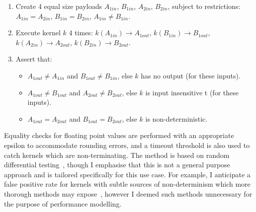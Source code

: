 \begin{enumerate}
\item Create 4 equal size payloads $A_{1in}$, $B_{1in}$, $A_{2in}$,
  $B_{2in}$, subject to restrictions: $A_{1in}=A_{2in}$,
  $B_{1in}=B_{2in}$, $A_{1in} \ne B_{1in}$.
\item Execute kernel $k$ 4 times: $k(A_{1in}) \rightarrow A_{1out}$,
  $k(B_{1in}) \rightarrow B_{1out}$,
  $k(A_{2in}) \rightarrow A_{2out}$,
  $k(B_{2in}) \rightarrow B_{2out}$.
\item Assert that:
  \begin{itemize}
  \item $A_{1out} \ne A_{1in}$ and $B_{1out} \ne B_{1in}$, else $k$ has no
  output (for these inputs).%
  \item $A_{1out} \ne B_{1out}$ and $A_{2out} \ne B_{2out}$, else $k$ is input insensitive t (for these inputs).%
  \item $A_{1out}=A_{2out}$ and $B_{1out}=B_{2out}$, else $k$ is
  non-deterministic.
  \end{itemize}
\end{enumerate}

Equality checks for floating point values are performed with an appropriate epsilon to accommodate rounding errors, and a timeout threshold is also used to catch kernels which are non-terminating. The method is based on random differential testing~\cite{McKeeman1998}, though I emphasise that this is not a general purpose approach and is tailored specifically for this use case. For example, I anticipate a false positive rate for kernels with subtle sources of non-determinism which more thorough methods may expose~\cite{Betts2012,Price2015,Sorensen2016}, however I deemed such methods unnecessary for the purpose of performance modelling.
